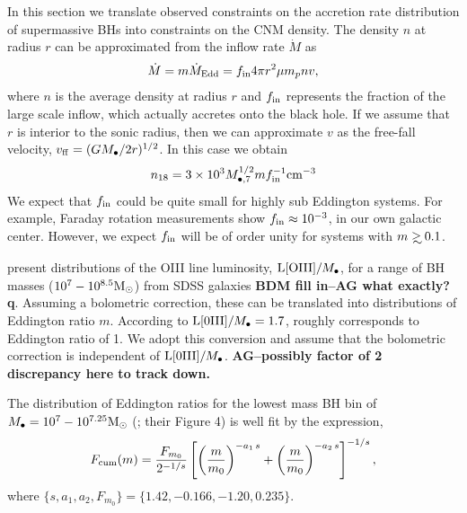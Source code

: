\documentclass[usenatbib,fleqn]{mnras}
\newcommand\gsim{\mathrel{\rlap{\lower4pt\hbox{\hskip1pt$\sim$}}
    \raise1pt\hbox{$>$}}}
\newcommand{\Mbh}[1][]{M_{\bullet#1}}
\newcommand{\Msun}{{\rm M_\odot}}
\begin{document}
In this section we translate observed constraints on the accretion
rate distribution of supermassive BHs into constraints on the CNM
density.  The density $n$ at radius $r$ can be approximated from the
inflow rate $\dot{M}$ as
\begin{equation}
\dot{M} = m \dot{M}_{\rm Edd}= f_{\rm in} 4 \pi r^2 \mu m_p n v,
\label{eq:mdot}
\end{equation}
where $n$ is the average density at radius $r$ and $f_{\rm in}$
represents the fraction of the large scale inflow, which actually
accretes onto the black hole.  If we assume that $r$ is interior to
the sonic radius, then we can approximate $v$ as the free-fall
velocity, $v_{\rm ff} = (GM_{\bullet}/2r)^{1/2}$.  In this case we
obtain
\begin{equation}
n_{18} = 3 \times 10^3 M_{\bullet,7}^{1/2} m f_{\rm in}^{-1} {\rm
  cm}^{-3}
\label{eq:n18Edd}
\end{equation}
We expect that $f_{\rm in}$ could be quite small for highly sub
Eddington systems. For example, Faraday rotation measurements
\citep{Quataert+2000} show $f_{\rm in}\approx 10^{-3}$, in our own
galactic center. However, we expect $f_{\rm in}$ will be of order
unity for systems with $m\gsim 0.1$.  

\citet{Kauffmann+2009} present distributions of the OIII line
luminosity, ${\rm L[OIII]}/\Mbh$, for a range of BH masses
($10^7-10^{8.5} \Msun$) from SDSS galaxies {\bf BDM fill in--AG what
  exactly?q}.  Assuming a bolometric correction, these can be
translated into distributions of Eddington ratio $m$.  According to
\citet{Kauffmann+2009} ${\rm L[0III]}/\Mbh=1.7$, roughly corresponds
to Eddington ratio of 1. We adopt this conversion and assume that the
bolometric correction is independent of ${\rm L[0III]}/\Mbh$. {\bf
  AG--possibly factor of 2 discrepancy here to track down.}

The distribution of Eddington ratios for the lowest mass BH bin of
$M_{\bullet} = 10^7 - 10^{7.25} \Msun$ (\citealt{Kauffmann+2009};
their Figure 4) is well fit by the expression,
\begin{align}
  F_{\rm cum}(m)=\frac{F_{m_0}}{2^{-1/s}}
  \left[\left(\frac{m}{m_0}\right)^{-a_1\,
      s}+\left(\frac{m}{m_0}\right)^{-a_2 \, s}\right]^{-1/s} \label{eq:khFit},
\end{align}
where $\{s, a_1, a_2, F_{m_0}\} =\{1.42, -0.166, -1.20, 0.235\}$.
\end{document}
